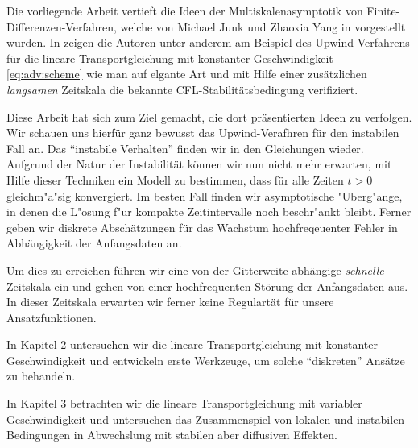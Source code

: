 
Die vorliegende Arbeit vertieft die Ideen der Multiskalenasymptotik von Finite-Dif\-fe\-ren\-zen-Verfahren, welche von Michael Junk und Zhaoxia Yang in \cite{Junk2004} vorgestellt wurden. 
In \cite{Junk2004} zeigen die Autoren unter anderem am Beispiel des Upwind-Ver\-fahrens für die lineare Transportgleichung mit konstanter Geschwindigkeit \eqref{eq:adv:scheme} wie man auf elgante Art und mit Hilfe einer zusätzlichen \emph{langsamen} Zeitskala die bekannte CFL-Sta\-bi\-li\-täts\-bedingung verifiziert.

Diese Arbeit hat sich zum Ziel gemacht, die dort präsentierten Ideen zu verfolgen.
Wir schauen uns hierfür ganz bewusst das Upwind-Verafhren für den instabilen Fall an.
Das ``instabile Verhalten'' finden wir in den Gleichungen wieder.
Aufgrund der Natur der Instabilität können wir nun nicht mehr erwarten, mit Hilfe dieser Techniken ein Modell zu bestimmen, dass für alle Zeiten $t > 0$ gleichm"a"sig konvergiert.
Im besten Fall finden wir asymptotische "Uberg"ange, in denen die L"osung f"ur kompakte Zeitintervalle noch beschr"ankt bleibt.
Ferner geben wir diskrete Abschätzungen für das Wachstum hochfreqeuenter Fehler in Abhängigkeit der Anfangsdaten an.

Um dies zu erreichen führen wir eine von der Gitterweite abhängige \emph{schnelle} Zeitskala ein und gehen von einer hochfrequenten Störung der Anfangsdaten aus.
In dieser Zeitskala erwarten wir ferner keine Regulartät für unsere Ansatzfunktionen.

In Kapitel 2 untersuchen wir die lineare Transportgleichung mit konstanter Geschwindigkeit und entwickeln erste Werkzeuge, um solche ``diskreten'' Ansätze zu behandeln.

In Kapitel 3 betrachten wir die lineare Transportgleichung mit variabler Geschwindigkeit und untersuchen das Zusammenspiel von lokalen und instabilen Bedingungen in Abwechslung mit stabilen aber diffusiven Effekten.